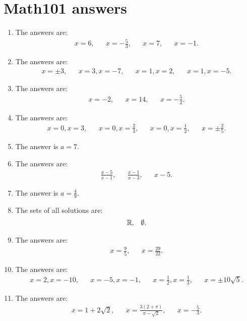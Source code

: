 \newpage
\section{Math101 answers}
\begin{enumerate}
\item The answers are:
\begin{align*}
x=6,&& x=-\frac{5}{3},&&x=7,&& x=-1.
\end{align*}

\item The answers are:
\begin{align*}
x=\pm 3,&&x=3,x=-7,&& x=1,x=2,&& x=1,x=-5.
\end{align*}

\item The answers are:
\begin{align*}
x=-2,&& x=14,&& x=-\frac{5}{2}.
\end{align*}

\item The answers are:
\begin{align*}
x=0,x=3,&& x=0,x=\frac{2}{3},&& x=0,x=\frac{1}{2},&& x=\pm \frac{2}{5}.
\end{align*}

\item The answer is $a=7$.

\item The answers are:
\begin{align*}
\frac{x-5}{x-1},&&\frac{x-1}{x-3},&& x-5.
\end{align*}

\item The answer is $a=\frac{4}{9}$.

\item The sets of all solutions are:
\begin{align*}
\mathbb{R},&& \emptyset.
\end{align*}


\item The answers are:
\begin{align*}
x=\frac{9}{5},&& x=\frac{29}{22}.
\end{align*}

\item The answers are:
\begin{align*}
x=2,x=-10,&& x=-5,x=-1,&&x=\frac{1}{2},x=\frac{1}{3},&& x=\pm 10\sqrt{5}.
\end{align*}



\item The answers are:
\begin{align*}
x=1+2\sqrt{2},&& x=\frac{3(2+\pi)}{\pi-\sqrt{2}},&& x=-\frac{5}{3}.
\end{align*}


\end{enumerate}
